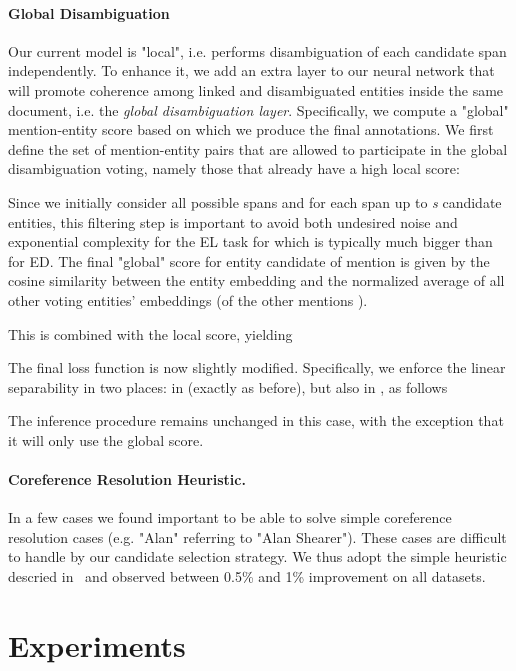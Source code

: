 \documentclass[11pt,a4paper]{article}
\begin{document}
\paragraph{Global Disambiguation} \label{paragraph_global_disambiguation}
Our current model is "local", i.e. performs disambiguation of each candidate span independently. To enhance it, we add an extra layer to our neural network that will promote coherence among linked and disambiguated entities inside the same document, i.e. the \textit{global disambiguation layer}. Specifically, we compute a "global" mention-entity score based on which we produce the final annotations. We first define the set of mention-entity pairs that are allowed to participate in the global disambiguation voting, namely those that already have a high local score:

Since we initially consider all possible spans and for each span up to \textit{s} candidate entities, this filtering step is important  to avoid both undesired noise and exponential complexity for the EL task for which  is typically much bigger than for ED. The final "global" score  for entity candidate  of mention  is given by the cosine similarity between the entity embedding and the normalized average of all other voting entities' embeddings (of the other mentions ).
 
This is combined with the local score, yielding

The final loss function is now slightly modified. Specifically, we enforce the linear separability in two places: in  (exactly as before), but also in , as follows


The inference procedure remains unchanged in this case, with the exception that it will only use the  global score.

\paragraph{Coreference Resolution Heuristic. } In a few cases we found important to be able to solve simple coreference resolution cases (e.g. "Alan" referring to "Alan Shearer"). These cases are difficult to handle by our candidate selection strategy. We thus adopt the simple heuristic descried in~\citep{ganea2017deep} and observed between 0.5\% and 1\% improvement on all datasets.



%
 
\section{Experiments}
\end{document}

